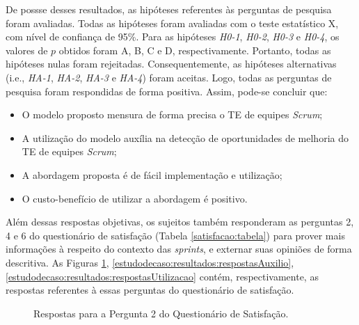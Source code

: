 De possse desses resultados, as hipóteses referentes às perguntas de pesquisa foram avaliadas. Todas as hipóteses foram avaliadas com o teste estatístico X, com nível de confiança de 95\%. Para as hipóteses \textit{H0-1}, \textit{H0-2}, \textit{H0-3} e \textit{H0-4}, os valores de $p$ obtidos foram A, B, C e D, respectivamente. Portanto, todas as hipóteses nulas foram rejeitadas. Consequentemente, as hipóteses alternativas (i.e., \textit{HA-1}, \textit{HA-2}, \textit{HA-3} e \textit{HA-4}) foram aceitas. Logo, todas as perguntas de pesquisa foram respondidas de forma positiva. Assim, pode-se concluir que:

\begin{itemize}
  \item O modelo proposto mensura de forma precisa o TE de equipes \textit{Scrum};
  \item A utilização do modelo auxília na detecção de oportunidades de melhoria do TE de equipes \textit{Scrum};
  \item A abordagem proposta é de fácil implementação e utilização;
  \item O custo-benefício de utilizar a abordagem é positivo.
\end{itemize}

Além dessas respostas objetivas, os sujeitos também responderam as perguntas 2, 4 e 6 do questionário de satisfação (Tabela \ref{satisfacao:tabela}) para prover mais informações à respeito do contexto das \textit{sprints}, e externar suas opiniões de forma descritiva. As Figuras \ref{estudodecaso:resultados:respostasFidelidade}, \ref{estudodecaso:resultados:respostasAuxilio}, \ref{estudodecaso:resultados:respostasUtilizacao} contém, respectivamente, as respostas referentes à essas perguntas do questionário de satisfação.

\begin{figure}[H]
\begin{center}
	\end{center}
	\caption{Respostas para a Pergunta 2 do Questionário de Satisfação.}
	\label{estudodecaso:resultados:respostasFidelidade}
\end{figure}

